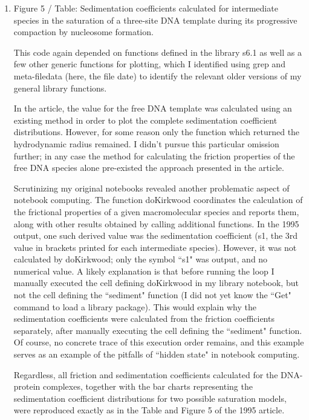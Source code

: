 \begin{enumerate}
\item Figure 5 / Table: Sedimentation coefficients calculated for intermediate species in the saturation of a three-site DNA template during its progressive compaction by nucleosome formation.
 
This code again depended on functions defined in the library s6.1 as well as a few other generic functions for plotting, which I identified using grep and meta-filedata (here, the file date) to identify the relevant older versions of my general library functions.

In the article, the value for the free DNA template was calculated using an existing method in order to plot the complete sedimentation coefficient distributions. However, for some reason only the function which returned the hydrodynamic radius remained. I didn't pursue this particular omission further; in any case the method for calculating the friction properties of the free DNA species alone pre-existed the approach presented in the article.

Scrutinizing my original notebooks revealed another problematic aspect of notebook computing. The function doKirkwood coordinates the calculation of the frictional properties of a given macromolecular species and reports them, along with other results obtained by calling additional functions. In the 1995 output, one such derived value was the sedimentation coefficient (s1, the 3rd value in brackets printed for each intermediate species). However, it was not calculated by doKirkwood; only the symbol ``s1" was output, and no numerical value. A likely explanation is that before running the loop I manually executed the cell defining doKirkwood in my library notebook, but not the cell defining the ``sediment" function (I did not yet know the ``Get" command to load a library package). This would explain why the sedimentation coefficients were calculated from the friction coefficients separately, after manually executing the cell defining the ``sediment" function. Of course, no concrete trace of this execution order remains, and this example serves as an example of the pitfalls of ``hidden state" in notebook computing.

Regardless, all friction and sedimentation coefficients calculated for the DNA-protein complexes, together with the bar charts representing the sedimentation coefficient distributions for two possible saturation models, were reproduced exactly as in the Table and Figure 5 of the 1995 article.

\end{enumerate}


